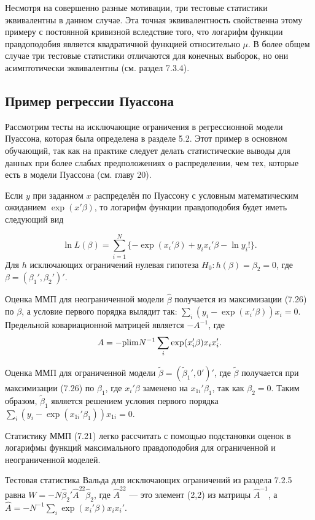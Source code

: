 Несмотря на совершенно разные мотивации, три тестовые статистики эквивалентны в данном случае. Эта точная эквивалентность свойственна этому примеру с постоянной кривизной вследствие того, что логарифм функции правдоподобия является квадратичной функцией относительно $\mu$. В более общем случае три тестовые статистики отличаются для конечных выборок, но они асимптотически эквивалентны (см. раздел 7.3.4).

\subsection{Пример регрессии Пуассона}

Рассмотрим тесты на исключающие ограничения в регрессионной модели Пуассона, которая была определена в разделе 5.2. Этот пример в основном обучающий, так как на практике следует делать статистические выводы для  данных при более слабых предположениях о распределении, чем тех, которые есть в модели Пуассона (см. главу 20).

Если $y$ при заданном $x$ распределён по Пуассону с условным математическим ожиданием $\exp(x'\beta)$, то логарифм функции правдоподобия будет иметь следующий вид

\begin{equation}
\ln L(\beta) = \sum_{i=1}^N \{- \exp(x_i'\beta) + y_ix_i'\beta - \ln y_i!\}.
\end{equation}
Для $h$ исключающих ограничений нулевая гипотеза $H_0: h(\beta) = \beta_2 = 0$, где $\beta = (\beta_1',\beta_2')'$.

Оценка ММП для неограниченной модели $\hat{\beta}$ получается из максимизации (7.26) по $\beta$, а условие первого порядка вылядит так: $\sum_i (y_i - \exp(x_i'\beta))x_i = 0$. Предельной ковариационной матрицей является $-A^{-1}$, где
\[
A = - \mathrm{plim } N^{-1} \sum_i \exp(x_i'\beta)x_ix_i'.
\]  

Оценка ММП для ограниченной модели $\tilde{\beta} = (\tilde{\beta}_1', 0')'$, где $\tilde{\beta}$ получается при максимизации (7.26) по $\beta_1$, где $x_i'\beta$ заменено на $x_{1i}'\beta_1$, так как $\beta_2 = 0$. Таким образом, $\tilde{\beta}_1$ является решением условия первого порядка $\sum_i (y_i - \exp(x_{1i}'\beta_1))x_{1i} = 0$.

Статистику ММП (7.21) легко рассчитать с помощью подстановки оценок в логарифмы функций максимального правдоподобия для ограниченной и неограниченной моделей.

Тестовая статистика Вальда для исключающих ограничений из раздела 7.2.5 равна $W = -N\hat{\beta}_2'\hat{A}^{22}\hat{\beta}_2$, где $\hat{A}^{22}$ --- это элемент (2,2) из матрицы $\hat{A}^{-1}$, а $\hat{A} = -N^{-1}\sum_i \exp(x_i'\beta)x_ix_i'$.

